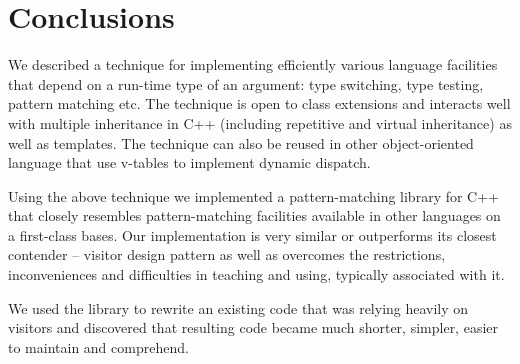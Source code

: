 \documentclass[preprint]{sigplanconf}
\begin{document}
\section{Conclusions} %
\label{sec:cc}

We described a technique for implementing efficiently various language 
facilities that depend on a run-time type of an argument: type switching, type 
testing, pattern matching etc. The technique is open to class extensions and 
interacts well with multiple inheritance in C++ (including repetitive and 
virtual inheritance) as well as templates. The technique can also be reused in 
other object-oriented language that use v-tables to implement dynamic dispatch.

Using the above technique we implemented a pattern-matching library for C++ that 
closely resembles pattern-matching facilities available in other languages on a 
first-class bases. Our implementation is very similar or outperforms its closest 
contender -- visitor design pattern as well as overcomes the restrictions, 
inconveniences and difficulties in teaching and using, typically associated with 
it.

We used the library to rewrite an existing code that was relying heavily on 
visitors and discovered that resulting code became much shorter, simpler, easier 
to maintain and comprehend.

\end{document}
